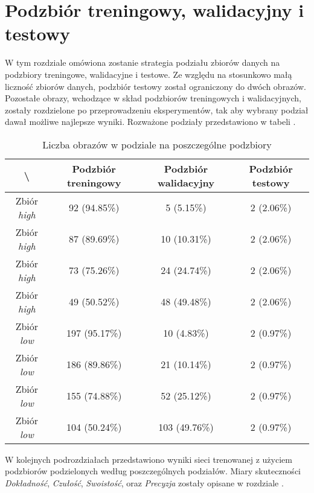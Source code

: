 \section{Podzbiór treningowy, walidacyjny i testowy}
\label{sec:podzial}
W tym rozdziale omówiona zostanie strategia podziału zbiorów danych na podzbiory treningowe, walidacyjne i testowe.
Ze względu na stosunkowo małą liczność zbiorów danych, podzbiór testowy został ograniczony do dwóch obrazów.
Pozostałe obrazy, wchodzące w skład podzbiorów treningowych i walidacyjnych, zostały rozdzielone po przeprowadzeniu eksperymentów, tak aby wybrany podział dawał możliwe najlepsze wyniki.
Rozważone podziały przedstawiono w tabeli .

\begin{table}[H]
	\centering
	\caption{Liczba obrazów w podziale na poszczególne podzbiory}
	\vspace{6pt}
	{\footnotesize
		\begin{tabular}{|c|c|c|c|}
			\hline \textbackslash & Podzbiór treningowy & Podzbiór walidacyjny & Podzbiór testowy \\
      \hline Zbiór \textit{high} & 92 (94.85\%) & 5 (5.15\%) & 2 (2.06\%) \\
      \hline Zbiór \textit{high} & 87 (89.69\%) & 10 (10.31\%) & 2 (2.06\%) \\
      \hline Zbiór \textit{high} & 73 (75.26\%) & 24 (24.74\%) & 2 (2.06\%) \\
      \hline Zbiór \textit{high} & 49 (50.52\%) & 48 (49.48\%) & 2 (2.06\%) \\
      \hline Zbiór \textit{low} & 197 (95.17\%) & 10 (4.83\%) & 2 (0.97\%) \\
      \hline Zbiór \textit{low} & 186 (89.86\%) & 21 (10.14\%) & 2 (0.97\%) \\
      \hline Zbiór \textit{low} & 155 (74.88\%) & 52 (25.12\%) & 2 (0.97\%) \\
      \hline Zbiór \textit{low} & 104 (50.24\%) & 103 (49.76\%) & 2 (0.97\%) \\
      \hline
    \end{tabular}
    \label{Tab:podzial}
	}
	\vspace{0pt}
\end{table}


W kolejnych podrozdziałach przedstawiono wyniki sieci trenowanej z użyciem podzbiorów podzielonych według poszczególnych podziałów.
Miary skuteczności \textit{Dokładność}, \textit{Czułość}, \textit{Swoistość}, oraz \textit{Precyzja} zostały opisane w rozdziale .
